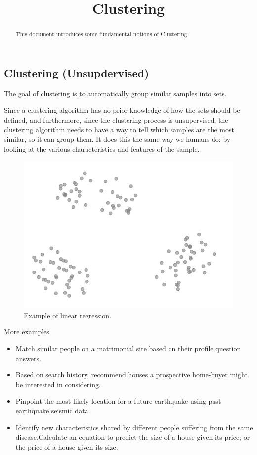 \documentclass{article}
\begin{document}
\title{Clustering}

\maketitle

\begin{abstract}
This document introduces some fundamental notions of Clustering.
\end{abstract}

\subsection{Clustering (Unsupdervised)}
\par The goal of clustering is to automatically group similar samples into sets.

Since a clustering algorithm has no prior knowledge of how the sets should be defined, and furthermore, since the clustering process is unsupervised, the clustering algorithm needs to have a way to tell which samples are the most similar, so it can group them. It does this the same way we humans do: by looking at the various characteristics and features of the sample.

\begin{figure}[H]
\centering
\includegraphics[width=0.6\linewidth]{pic/clustering.png}
\caption{Example of linear regression.}
\end{figure}

More examples

\begin{itemize}
    \item Match similar people on a matrimonial site based on their profile question answers.
    \item Based on search history, recommend houses a prospective home-buyer might be interested in considering.
    \item Pinpoint the most likely location for a future earthquake using past earthquake seismic data.
    \item Identify new characteristics shared by different people suffering from the same disease.Calculate an equation to predict the size of a house given its price; or the price of a house given its size.
\end{itemize}
\end{document}
